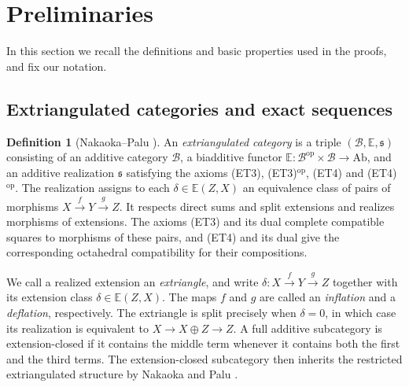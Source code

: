 \documentclass[pdflatex,sn-mathphys-num]{sn-jnl}
\numberwithin{equation}{section}
\theoremstyle{definition}
\newtheorem{definition}[theorem]{Definition}
\theoremstyle{remark}\newtheorem{remark}[theorem]{Remark}
\newcommand{\E}{\mathbb E}
\begin{document}
\section{Preliminaries}\label{sec:preliminaries}
In this section we recall the definitions and basic properties used in
the proofs, and fix our notation.

\subsection{Extriangulated categories and exact sequences}
\begin{definition}[{Nakaoka--Palu \cite[Definition 2.12]{NP}}]
An \emph{extriangulated category} is a triple
$(\mathcal B,\E,\mathfrak s)$ consisting of an additive category
$\mathcal B$, a biadditive functor
$\E:\mathcal B^{\mathrm{op}}\times\mathcal B\to\mathrm{Ab}$, and an
additive realization $\mathfrak s$ satisfying the axioms
\textup{(ET3)}, \textup{(ET3)$^{\mathrm{op}}$}, \textup{(ET4)} and
\textup{(ET4)$^{\mathrm{op}}$}. The realization assigns to each
$\delta\in\E(Z,X)$ an equivalence class of pairs of morphisms
$X\xrightarrow fY\xrightarrow gZ$. It respects direct sums and split
extensions and realizes morphisms of extensions. The axioms
\textup{(ET3)} and its dual complete compatible squares to morphisms
of these pairs, and \textup{(ET4)} and its dual give the corresponding
octahedral compatibility for their compositions.
\end{definition}

We call a realized extension an \emph{extriangle}, and write
$\delta:X\xrightarrow fY\xrightarrow gZ$ together with its extension
class $\delta\in\E(Z,X)$. The maps $f$ and $g$ are called an
\emph{inflation} and a \emph{deflation}, respectively. The extriangle
is split precisely when $\delta=0$, in which case its realization is
equivalent to $X\to X\oplus Z\to Z$. A full additive subcategory is
extension-closed if it contains the middle term whenever it contains
both the first and the third terms. The extension-closed subcategory then inherits the restricted extriangulated
structure by Nakaoka and Palu \cite[Remark 2.18]{NP}.
\end{document}
